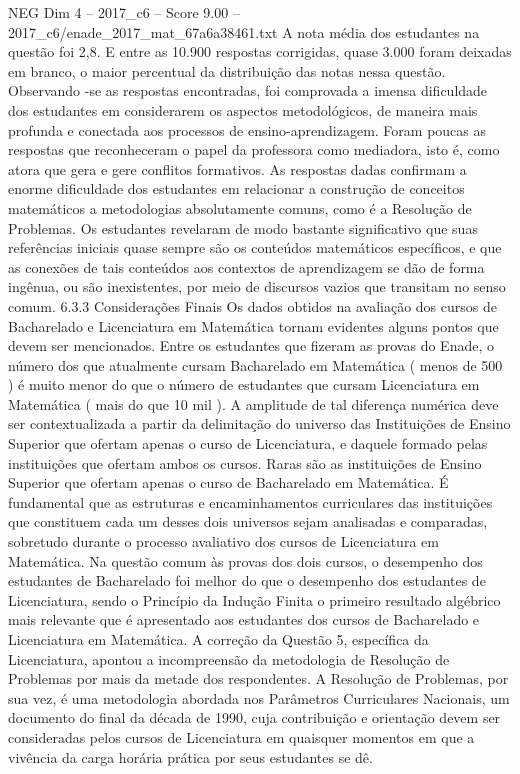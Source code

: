 \begin{textsample}{NEG Dim 4 – 2017\_c6 – Score 9.00 – 2017\_c6/enade\_2017\_mat\_67a6a38461.txt}
A nota média dos estudantes na questão foi 2,8.
E entre as 10.900 respostas corrigidas, quase 3.000 foram deixadas em branco, o maior percentual da distribuição das notas nessa questão.
Observando -se as respostas encontradas, foi comprovada a imensa dificuldade dos estudantes em considerarem os aspectos metodológicos, de maneira mais profunda e conectada aos processos de ensino-aprendizagem.
Foram poucas as respostas que reconheceram o papel da professora como mediadora, isto é, como atora que gera e gere conflitos formativos.
As respostas dadas confirmam a enorme dificuldade dos estudantes em relacionar a construção de conceitos matemáticos a metodologias absolutamente comuns, como é a Resolução de Problemas.
Os estudantes revelaram de modo bastante significativo que suas referências iniciais quase sempre são os conteúdos matemáticos específicos, e que as conexões de tais conteúdos aos contextos de aprendizagem se dão de forma ingênua, ou são inexistentes, por meio de discursos vazios que transitam no senso comum. 6.3.3 Considerações Finais Os dados obtidos na avaliação dos cursos de Bacharelado e Licenciatura em Matemática tornam evidentes alguns pontos que devem ser mencionados.
Entre os estudantes que fizeram as provas do Enade, o número dos que atualmente cursam Bacharelado em Matemática ( menos de 500 ) é muito menor do que o número de estudantes que cursam Licenciatura em Matemática ( mais do que 10 mil ).
A amplitude de tal diferença numérica deve ser contextualizada a partir da delimitação do universo das Instituições de Ensino Superior que ofertam apenas o curso de Licenciatura, e daquele formado pelas instituições que ofertam ambos os cursos.
Raras são as instituições de Ensino Superior que ofertam apenas o curso de Bacharelado em Matemática.
É fundamental que as estruturas e encaminhamentos curriculares das instituições que constituem cada um desses dois universos sejam analisadas e comparadas, sobretudo durante o processo avaliativo dos cursos de Licenciatura em Matemática.
Na questão comum às provas dos dois cursos, o desempenho dos estudantes de Bacharelado foi melhor do que o desempenho dos estudantes de Licenciatura, sendo o Princípio da Indução Finita o primeiro resultado algébrico mais relevante que é apresentado aos estudantes dos cursos de Bacharelado e Licenciatura em Matemática.
A correção da Questão 5, específica da Licenciatura, apontou a incompreensão da metodologia de Resolução de Problemas por mais da metade dos respondentes.
A Resolução de Problemas, por sua vez, é uma metodologia abordada nos Parâmetros Curriculares Nacionais, um documento do final da década de 1990, cuja contribuição e orientação devem ser consideradas pelos cursos de Licenciatura em quaisquer momentos em que a vivência da carga horária prática por seus estudantes se dê.

\end{textsample}
